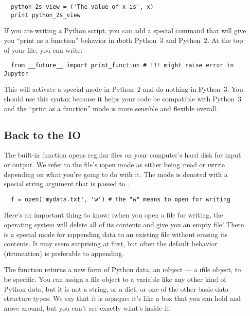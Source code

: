 \documentclass[letterpaper, 12pt, titlepage, twoside]{article}
\begin{document}
\begin{lstlisting}
  python_2s_view = ('The value of x is', x)
  print python_2s_view
\end{lstlisting}

If you are writing a Python script, you can add a special command that will
give you ``print as a function'' behavior in \i{both} Python~3 and Python~2.
At the top of your file, you can write:

\begin{lstlisting}
  from __future__ import print_function # !!! might raise error in Jupyter
\end{lstlisting}

This will activate a special mode in Python~2 and do nothing in Python~3. You
should use this syntax because it helps your code be compatible with Python~3
and the ``print as a function'' mode is more sensible and flexible overall.

\subsection*{Back to the IO}

The built-in  function opens regular files on your computer's hard
disk for input or output. We refer to the file's \i{open mode} as either being
\i{read} or \i{write} depending on what you're going to do with it. The mode
is denoted with a special string argument that is passed to .

\begin{lstlisting}
  f = open('mydata.txt', 'w') # the "w" means to open for writing
\end{lstlisting}

Here's an important thing to know: \i{when you open a file for writing, the
  operating system will delete all of its contents and give you an empty
  file!} There is a special  mode for \i{appending} data to an existing
file without erasing its contents. It may seem surprising at first, but often
the default behavior (\i{truncation}) is preferable to appending.

The  function returns a new form of Python data, an \i{object} --- a
\i{file object}, to be specific. You can assign a file object to a variable
like any other kind of Python data, but it is not a string, or a dict, or one
of the other basic data structure types. We say that it is \i{opaque}: it's
like a box that you can hold and move around, but you can't see exactly what's
inside it.
\end{document}
